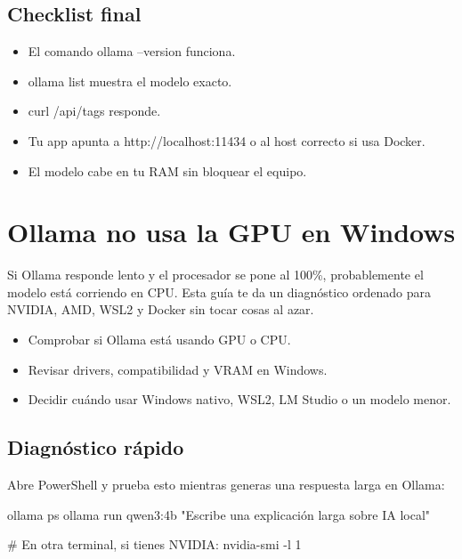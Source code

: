 \documentclass[11pt,a4paper]{book}
\begin{document}
\section{Checklist final}
\begin{itemize}\item El comando ollama --version funciona.\end{itemize}
\begin{itemize}\item ollama list muestra el modelo exacto.\end{itemize}
\begin{itemize}\item curl /api/tags responde.\end{itemize}
\begin{itemize}\item Tu app apunta a http://localhost:11434 o al host correcto si usa Docker.\end{itemize}
\begin{itemize}\item El modelo cabe en tu RAM sin bloquear el equipo.\end{itemize}
\chapter{Ollama no usa la GPU en Windows}
Si Ollama responde lento y el procesador se pone al 100\%, probablemente el modelo está corriendo en CPU. Esta guía te da un diagnóstico ordenado para NVIDIA, AMD, WSL2 y Docker sin tocar cosas al azar.

\begin{itemize}\item Comprobar si Ollama está usando GPU o CPU.\end{itemize}
\begin{itemize}\item Revisar drivers, compatibilidad y VRAM en Windows.\end{itemize}
\begin{itemize}\item Decidir cuándo usar Windows nativo, WSL2, LM Studio o un modelo menor.\end{itemize}
\section{Diagnóstico rápido}
Abre PowerShell y prueba esto mientras generas una respuesta larga en Ollama:

\begin{codebox}
ollama ps
ollama run qwen3:4b "Escribe una explicación larga sobre IA local"

# En otra terminal, si tienes NVIDIA:
nvidia-smi -l 1
\end{codebox}
\end{document}

